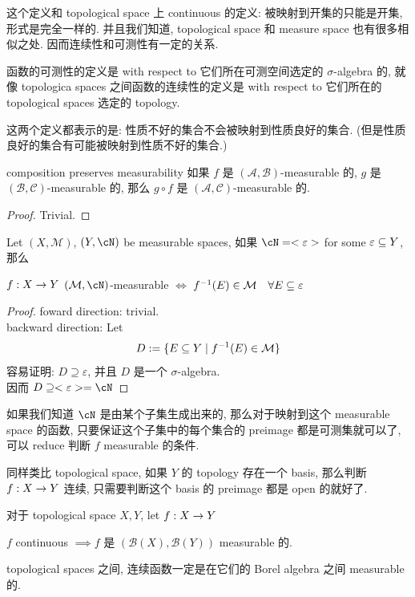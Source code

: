 \documentclass[lang=cn,11pt]{elegantbook}
\begin{document}
这个定义和 topological space 上 continuous 的定义: 被映射到开集的只能是开集, 形式是完全一样的. 并且我们知道, topological space 和 measure space 也有很多相似之处. 因而连续性和可测性有一定的关系.

函数的可测性的定义是 with respect to 它们所在可测空间选定的 $\sigma$-algebra 的, 就像 topologica spaces 之间函数的连续性的定义是 with respect to 它们所在的 topological spaces 选定的 topology.

这两个定义都表示的是: 性质不好的集合不会被映射到性质良好的集合. (但是性质良好的集合有可能被映射到性质不好的集合.)


\begin{proposition}{composition preserves measurability}
    如果 $f$ 是 $(\mathcal{A},\mathcal{B})$-measurable 的, $g$ 是 $(\mathcal{B}, \mathcal{C})$-measurable 的, 那么 $g \circ f$ 是 $(\mathcal{A}, \mathcal{C})$-measurable 的.
\end{proposition}
\begin{proof}
    Trivial.
\end{proof}

\begin{lemma}
    Let $(X,\mathcal{M})$, $(Y,\cN)$ be measurable spaces, 如果 $\cN = <\varepsilon>$ for some $\varepsilon \subseteq Y$, 那么 
\begin{center}
    $f: X \rightarrow Y$  $(\mathcal{M},\cN)$-measurable  $\Longleftrightarrow$ $f^{-1}(E) \in \mathcal{M}  \quad \forall E \subseteq \varepsilon$
\end{center}

\end{lemma}
\begin{proof}
foward direction: trivial.\\
backward direction: Let
$$
D: = \{ E \subseteq Y \mid f^{-1}(E) \in \mathcal{M}\}
$$
容易证明: $D \supseteq \varepsilon$, 并且 $D$ 是一个 $\sigma$-algebra.\\
因而 $D \supseteq <\varepsilon> = \cN$
\end{proof}
\begin{remark}
    如果我们知道 $\cN$ 是由某个子集生成出来的, 那么对于映射到这个 measurable space 的函数, 只要保证这个子集中的每个集合的 preimage 都是可测集就可以了, 可以 reduce 判断 $f$ measurable 的条件.

    同样类比 topological space, 如果 $Y$ 的 topology 存在一个 basis, 那么判断 $f: X\rightarrow Y$ 连续, 只需要判断这个 basis 的 preimage 都是 open 的就好了.
\end{remark}

\begin{proposition}
对于 topological space $X,Y$, let $f:X\rightarrow Y$
\begin{center}
    $f$ continuous $\implies$$f$ 是 $(\mathcal{B}(X),\mathcal{B}(Y))$ measurable 的.
\end{center}
\end{proposition}
\begin{remark}
    topological spaces 之间, 连续函数一定是在它们的 Borel algebra 之间 measurable 的.
\end{remark}
\end{document}
